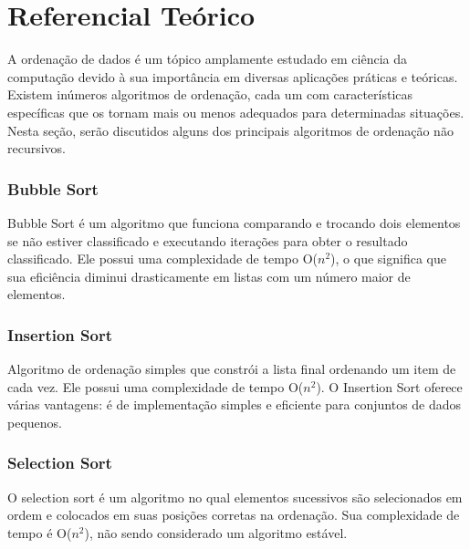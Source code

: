 \section{Referencial Teórico}

A ordenação de dados é um tópico amplamente estudado em ciência da computação devido à sua importância em diversas aplicações práticas e teóricas. Existem inúmeros algoritmos de ordenação, cada um com características específicas que os tornam mais ou menos adequados para determinadas situações. Nesta seção, serão discutidos alguns dos principais algoritmos de ordenação não recursivos.

\subsubsection{Bubble Sort}
Bubble Sort é um algoritmo que funciona comparando e trocando dois elementos se não estiver classificado e executando iterações para obter o resultado classificado\cite{analiseBubbleSort:2021}. Ele possui uma complexidade de tempo O($n^2$), o que significa que sua eficiência diminui drasticamente em listas com um número maior de elementos\cite{al2013review}.

\subsubsection{Insertion Sort}
Algoritmo de ordenação simples que constrói a lista final ordenando um item de cada vez. Ele possui uma complexidade de tempo O($n^2$). O Insertion Sort oferece várias vantagens: é de implementação simples e eficiente para conjuntos de dados pequenos\cite{al2013review}.

\subsubsection{Selection Sort}
O selection sort é um algoritmo no qual elementos sucessivos são selecionados em ordem e colocados em suas posições corretas na ordenação\cite{chand2011upgraded}. Sua complexidade de tempo é O($n^2$), não sendo considerado um algoritmo estável\cite{treinawebConheaPrincipais}.